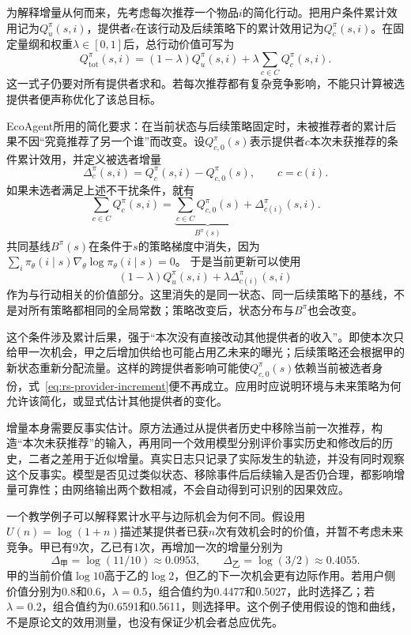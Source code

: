 为解释增量从何而来，先考虑每次推荐一个物品$i$的简化行动。把用户条件累计效用记为$Q_u^\pi(s,i)$，提供者$c$在该行动及后续策略下的累计效用记为$Q_c^\pi(s,i)$。在固定量纲和权重$\lambda\in[0,1]$后，总行动价值可写为
\[
 Q_{\mathrm{tot}}^\pi(s,i)
 =(1-\lambda)Q_u^\pi(s,i)
   +\lambda\sum_{c\in C}Q_c^\pi(s,i).
\]
这一式子仍要对所有提供者求和。若每次推荐都有复杂竞争影响，不能只计算被选提供者便声称优化了该总目标。

EcoAgent所用的简化要求：在当前状态与后续策略固定时，未被推荐者的累计后果不因“究竟推荐了另一个谁”而改变。设$Q_{c,0}^\pi(s)$表示提供者$c$本次未获推荐的条件累计效用，并定义被选者增量
\[
 \Delta_c^\pi(s,i)
 =Q_c^\pi(s,i)-Q_{c,0}^\pi(s),
 \qquad c=c(i).
\]
如果未选者满足上述不干扰条件，就有
\begin{equation}
 \sum_{c\in C}Q_c^\pi(s,i)
 =\underbrace{\sum_{c\in C}Q_{c,0}^\pi(s)}_{B^\pi(s)}
  +\Delta_{c(i)}^\pi(s,i).
 \label{eq:rs-provider-increment}
\end{equation}
共同基线$B^\pi(s)$在条件于$s$的策略梯度中消失，因为
$\sum_i\pi_\theta(i\mid s)\nabla_\theta\log\pi_\theta(i\mid s)=0$。
于是当前更新可以使用
\[
 (1-\lambda)Q_u^\pi(s,i)
 +\lambda\Delta_{c(i)}^\pi(s,i)
\]
作为与行动相关的价值部分。这里消失的是同一状态、同一后续策略下的基线，不是对所有策略都相同的全局常数；策略改变后，状态分布与$B^\pi$也会改变。

这个条件涉及累计后果，强于“本次没有直接改动其他提供者的收入”。即使本次只给甲一次机会，甲之后增加供给也可能占用乙未来的曝光；后续策略还会根据甲的新状态重新分配流量。这样的跨提供者影响可能使$Q_{c,0}^\pi(s)$依赖当前被选者身份，式~\eqref{eq:rs-provider-increment}便不再成立。应用时应说明环境与未来策略为何允许该简化，或显式估计其他提供者的变化。

增量本身需要反事实估计。原方法通过从提供者历史中移除当前一次推荐，构造“本次未获推荐”的输入，再用同一个效用模型分别评价事实历史和修改后的历史，二者之差用于近似增量。真实日志只记录了实际发生的轨迹，并没有同时观察这个反事实。模型是否见过类似状态、移除事件后后续输入是否仍合理，都影响增量可靠性；由网络输出两个数相减，不会自动得到可识别的因果效应。

一个教学例子可以解释累计水平与边际机会为何不同。假设用$U(n)=\log(1+n)$描述某提供者已获$n$次有效机会时的价值，并暂不考虑未来竞争。甲已有9次，乙已有1次，再增加一次的增量分别为
\[
 \Delta_{\text{甲}}=\log(11/10)\approx0.0953,
 \qquad
 \Delta_{\text{乙}}=\log(3/2)\approx0.4055.
\]
甲的当前价值$\log10$高于乙的$\log2$，但乙的下一次机会更有边际作用。若用户侧价值分别为0.8和0.6，$\lambda=0.5$，组合值约为0.4477和0.5027，此时选择乙；若$\lambda=0.2$，组合值约为0.6591和0.5611，则选择甲。这个例子使用假设的饱和曲线，不是原论文的效用测量，也没有保证少机会者总应优先。

